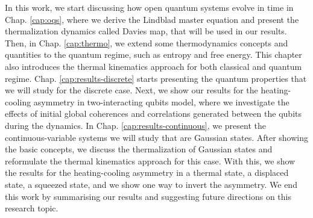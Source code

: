 In this work, we start discussing how open quantum systems evolve in time in Chap. \ref{cap:oqs}, where we derive the Lindblad master equation and present the thermalization dynamics called Davies map, that will be used in our results. Then, in Chap. \ref{cap:thermo}, we extend some thermodynamics concepts and quantities to the quantum regime, such as entropy and free energy. This chapter also introduces the thermal kinematics approach for both classical and quantum regime. Chap. \ref{cap:results-discrete} starts presenting the quantum properties that we will study for the discrete case. Next, we show our results for the heating-cooling asymmetry in two-interacting qubits model, where we investigate the effects of initial global coherences and correlations generated between the qubits during the dynamics. In Chap. \ref{cap:results-continuous}, we present the continuous-variable systems we will study that are Gaussian states. After showing the basic concepts, we discuss the thermalization of Gaussian states and reformulate the thermal kinematics approach for this case. With this, we show the results for the heating-cooling asymmetry in a thermal state, a displaced state, a squeezed state, and we show one way to invert the asymmetry. We end this work by summarising our results and suggesting future directions on this research topic.



